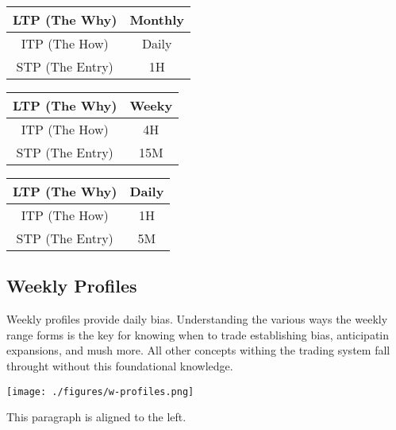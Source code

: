 \documentclass{article}
\begin{document}
\begin{minipage}{0.34\textwidth}
    \centering
    \renewcommand{\arraystretch}{1.5} %
    \begin{tabular}{|c|c|}
    \hline
      LTP (The Why)  & Monthly \\ \hline
      ITP (The How)  & Daily \\ \hline
      STP (The Entry)& 1H \\ \hline
    \end{tabular}
\end{minipage}
\hfill
\begin{minipage}{0.3\textwidth}
    \centering
    \renewcommand{\arraystretch}{1.5} %
    \begin{tabular}{|c|c|}
    \hline
      LTP (The Why)  & Weeky \\ \hline
      ITP (The How)  & 4H \\ \hline
      STP (The Entry)& 15M \\ \hline
    \end{tabular}
\end{minipage}
\begin{minipage}{0.3\textwidth}
    \centering
    \renewcommand{\arraystretch}{1.5} %
    \begin{tabular}{|c|c|}
    \hline
      LTP (The Why)  & Daily \\ \hline
      ITP (The How)  & 1H \\ \hline
      STP (The Entry)& 5M \\ \hline
    \end{tabular}
\end{minipage}
\hfill
\newpage

\subsection{Weekly Profiles}
Weekly profiles provide daily bias. Understanding the various ways the weekly range forms is the key for knowing when to trade establishing bias, anticipatin expansions, and mush more. All other concepts withing the trading system fall throught without this foundational knowledge.

  \begin{center}
    \texttt{[image: ./figures/w-profiles.png]}
  \end{center}
\begin{flushleft}
This paragraph is aligned to the left.
\end{flushleft}
\newpage
\end{document}
